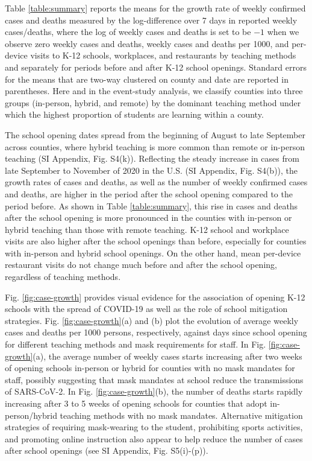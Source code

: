 \documentclass[9pt,twocolumn,twoside,lineno]{pnas-new}
\begin{document}
Table \ref{table:summary} reports the means for the growth rate of weekly confirmed cases and deaths measured by the log-difference over 7 days in reported weekly cases/deaths, where the log of weekly cases and deaths is set to be $-1$ when we observe zero weekly cases and deaths, weekly cases and deaths per 1000, and per-device visits to K-12 schools, workplaces, and restaurants by teaching methods and separately for periods before and after K-12 school openings. Standard errors for the means that are two-way clustered on county and date are reported in parentheses. Here and in the event-study analysis, we classify counties into three groups (in-person, hybrid, and remote) by the dominant teaching method under which the highest proportion of students are learning within a county.

The school opening dates spread from the beginning of August to late September across counties, where
hybrid teaching  is more common than remote or in-person teaching (SI Appendix, Fig. S4(k)).  Reflecting the steady increase in cases from late September to November of 2020 in the U.S. (SI Appendix, Fig. S4(b)),  the growth rates of cases and deaths, as well as the number of weekly confirmed cases and deaths, are higher in the period after the school opening compared to the period before. As shown in Table \ref{table:summary}, this rise in cases and deaths after the school opening is more pronounced in the counties with in-person or hybrid teaching than those with remote teaching.  K-12 school and workplace visits are also higher after the school openings than before, especially for counties with in-person and hybrid school openings. On the other hand, mean per-device restaurant visits do not change much before and after the school opening, regardless of teaching methods.

 Fig.  \ref{fig:case-growth} provides visual evidence for the association of opening K-12 schools with the spread of COVID-19 as well as the role of school mitigation strategies. Fig.  \ref{fig:case-growth}(a) and (b) plot the evolution of average weekly cases and deaths per 1000 persons, respectively, against days since school opening for different teaching methods and mask requirements for staff. In Fig.  \ref{fig:case-growth}(a), the average number of weekly cases starts increasing after two weeks of opening schools in-person or hybrid for counties with no mask mandates for staff, possibly suggesting that mask mandates at school reduce the transmissions of SARS-CoV-2. In Fig.  \ref{fig:case-growth}(b), the number of deaths starts rapidly increasing after 3 to 5 weeks of opening schools for counties that adopt in-person/hybrid teaching methods with no mask mandates.  Alternative mitigation strategies of requiring mask-wearing to the student, prohibiting sports activities, and promoting online instruction also appear to help reduce the number of cases after school openings (see SI Appendix, Fig.  S5(i)-(p)).
\end{document}
